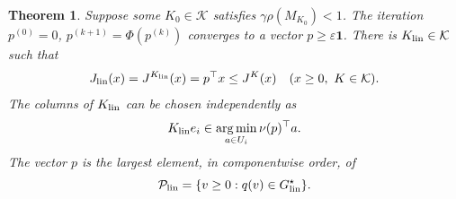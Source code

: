 \documentclass[10pt]{article}
\newtheorem{theorem}{Theorem}
\newcommand{\one}{\mathbf 1}
\DeclareMathOperator*{\argmin}{arg\,min}
\begin{document}
\begin{theorem}
\label{thm:best-linear}
Suppose some $K_0\in\mathcal K$ satisfies $\gamma\rho(M_{K_0})<1$. The iteration $p^{(0)}=0$, $p^{(k+1)}=\Phi(p^{(k)})$ converges to a vector $p\ge\varepsilon\one$. There is $K_{\rm lin}\in\mathcal K$ such that
\begin{equation}
 J_{\rm lin}(x)=J^{K_{\rm lin}}(x)=p^\top x\le J^K(x)
 \quad(x\ge0,\ K\in\mathcal K).
 \label{eq:best-linear}
\end{equation}
The columns of $K_{\rm lin}$ can be chosen independently as
\begin{equation}
 K_{\rm lin}e_i\in\argmin_{a\in U_i}\nu(p)^\top a.
 \label{eq:optimal-columns}
\end{equation}
The vector $p$ is the largest element, in componentwise order, of
\begin{equation}
 \mathcal P_{\rm lin}=\{v\ge0:q(v)\in G_{\rm lin}^\star\}.
 \label{eq:restricted-subsolutions}
\end{equation}
\end{theorem}
\end{document}

